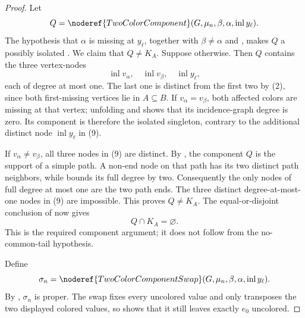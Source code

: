 \begin{proof}
Let
\[
 Q=\noderef{TwoColorComponent}
      (G,\mu_n,\beta,\alpha,\operatorname{inl}y_\ell).
\]
The hypothesis that \(\alpha\) is missing at \(y_\ell\), together with
\(\beta\ne\alpha\) and
, makes \(Q\) a possibly isolated
.  We claim that \(Q\ne K_A\).
Suppose otherwise.  Then \(Q\) contains the three vertex-nodes
\[
       \operatorname{inl}v_\alpha,\quad
       \operatorname{inl}v_\beta,\quad
       \operatorname{inl}y_\ell,                              \tag{9}
\]
each of degree at most one.  The last one is distinct from the first two
by (2), since both first-missing vertices lie in \(A\subseteq B\).
If \(v_\alpha=v_\beta\), both affected colors are missing at that vertex;
unfolding  and
 shows that its incidence-graph degree is
zero.  Its component is therefore the isolated singleton, contrary to
the additional distinct node \(\operatorname{inl}y_\ell\) in (9).

If \(v_\alpha\ne v_\beta\), all three nodes in (9) are distinct.
By , the component \(Q\) is the
support of a simple path.  A non-end node on that path has its two
distinct path neighbors, while
 bounds its full degree by two.
Consequently the only nodes of full degree at most one are the two path
ends.  The three distinct degree-at-most-one nodes in (9) are impossible.
This proves \(Q\ne K_A\).  The equal-or-disjoint conclusion of
 now gives
\[
                         Q\cap K_A=\varnothing.                \tag{10}
\]
This is the required component argument; it does not follow from the
no-common-tail hypothesis.

Define
\[
 \sigma_n=\noderef{TwoColorComponentSwap}
       (G,\mu_n,\beta,\alpha,\operatorname{inl}y_\ell).
\]
By , \(\sigma_n\) is proper.
The swap fixes every uncolored value and only transposes the two displayed
colored values, so  shows that it still leaves
exactly \(e_0\) uncolored.


\end{proof}
